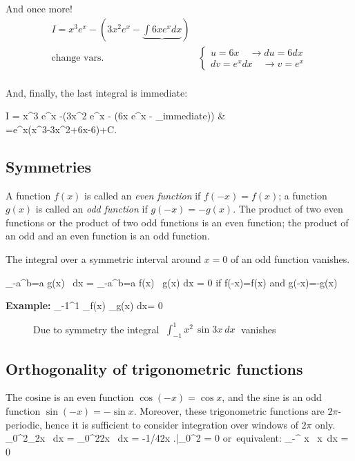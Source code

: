 And once more!
\begin{eqnarray*}
I = x^3 e^x -(3x^2 e^x - \underbrace{\int 6x e^x dx}) &  \\
\mbox{change vars.}& \begin{cases} 
   u=6x \quad \rightarrow du=6 dx\\
   dv = e^x dx  \quad \rightarrow  v= e^x 
\end{cases}  \\
\end{eqnarray*}

And, finally, the last integral is immediate:

\bnn
I = x^3 e^x -(3x^2 e^x - (6x e^x - _{\mbox{immediate}})) &  \\
  =e^x(x^3-3x^2+6x-6)+C.
\enn




\subsection{Symmetries}
A function $f(x)$ is called an {\em even function} if $f(-x)=f(x)$; a function $g(x)$ is called an {\em odd function}
if $g(-x)=-g(x)$. The product of two even functions or the product of two odd functions is an even function; the product
of an odd and an even function is an odd function.

The integral over a symmetric interval around $x=0$ of an odd function vanishes.
 
\bnn 
\int_{-a}^{b=a} g(x) \, dx = \int_{-a}^{b=a} f(x) \, g(x) \: dx = 0 \qquad
\mbox{if} \;\; f(-x)=f(x) \quad \mbox{and} \quad g(-x)=-g(x) 
\enn

{\bf Example:}
\bnn \int_{-1}^1 _{f(x)} _{g(x)}\: dx= 0 \enn

\begin{figure}[!h]
    \centerline{\epsfxsize=12cm \epsfysize=8cm  } \svs
    \caption{Due to symmetry the integral $\; \int_{-1}^1 x^2 \, \sin 3x\:dx\;$ vanishes} \label{fig26}
\end{figure} \vs \svs

\subsection{Orthogonality of trigonometric functions}
The cosine is an even function $\cos (-x)=\cos x$, and the sine is an odd function \mbox{$\sin(-x)=-\sin x$.}
Moreover, these trigonometric functions are $2\pi$-periodic, hence it is sufficient to consider integration
over windows of $2\pi$ only.
\bnn
\int_0^{2\pi}_{\sin 2x} \, dx
    =  \int_0^{2\pi}\sin 2x \, dx = -1/4\cos 2x \! \left.\frac{}{}\right|_0^{2\pi} = 0 \quad \mbox{or equivalent:} \;\;
     \int_{-\pi}^{\pi} \sin x \, \cos x\, dx = 0
\enn


